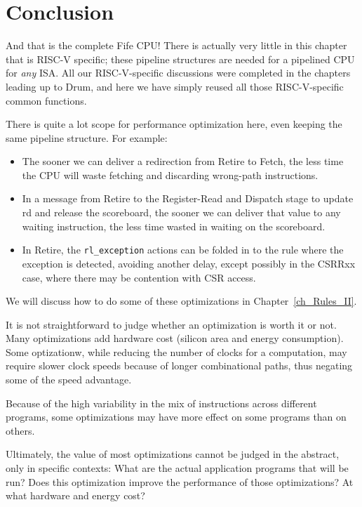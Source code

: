 


\section{Conclusion}

And that is the complete Fife CPU!  There is actually very little in
this chapter that is RISC-V specific; these pipeline structures are
needed for a pipelined CPU for \emph{any} ISA.  All our
RISC-V-specific discussions were completed in the chapters leading up
to Drum, and here we have simply reused all those RISC-V-specific
common functions.

There is quite a lot scope for performance optimization here, even
keeping the same pipeline structure.  For example:

\begin{itemize}

\item The sooner we can deliver a redirection from Retire to Fetch,
      the less time the CPU will waste fetching and discarding
      wrong-path instructions.

\item In a message from Retire to the Register-Read and Dispatch stage
      to update rd and release the scoreboard, the sooner we can
      deliver that value to any waiting instruction, the less time
      wasted in waiting on the scoreboard.

\item In Retire, the \verb|rl_exception| actions can be folded in to
      the rule where the exception is detected, avoiding another
      delay, except possibly in the CSRRxx case, where there may be
      contention with CSR access.

\end{itemize}

We will discuss how to do some of these optimizations in
Chapter~\ref{ch_Rules_II}.

It is not straightforward to judge whether an optimization is worth it
or not.  Many optimizations add hardware cost (silicon area and energy
consumption).  Some optizationw, while reducing the number of clocks
for a computation, may require slower clock speeds because of longer
combinational paths, thus negating some of the speed advantage.

Because of the high variability in the mix of instructions across
different programs, some optimizations may have more effect on some
programs than on others.

Ultimately, the value of most optimizations cannot be judged in the
abstract, only in specific contexts: What are the actual application
programs that will be run? Does this optimization improve the
performance of those optimizations? At what hardware and energy cost?

